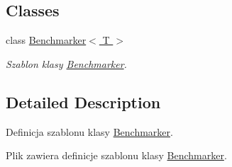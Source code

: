 \subsection*{Classes}
\begin{DoxyCompactItemize}
\item 
class \hyperlink{a00009}{Benchmarker$<$ T $>$}
\begin{DoxyCompactList}\small\item\em Szablon klasy \hyperlink{a00009}{Benchmarker}. \end{DoxyCompactList}\end{DoxyCompactItemize}


\subsection{Detailed Description}
Definicja szablonu klasy \hyperlink{a00009}{Benchmarker}. 

Plik zawiera definicje szablonu klasy \hyperlink{a00009}{Benchmarker}. 